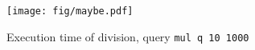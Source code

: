 \begin{figure}[h]
  \centering
\texttt{[image: fig/maybe.pdf]}
  \caption{Execution time of division, query \lstinline{mul q 10 1000}}
  \label{fig:maybe}
\end{figure}
